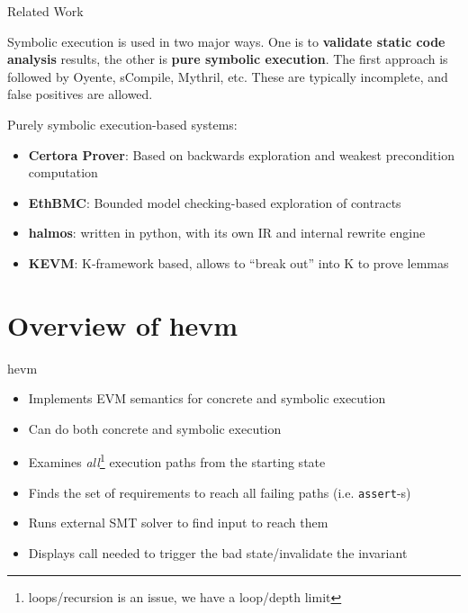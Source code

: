 \documentclass[aspectratio=169]{beamer}
\begin{document}
\begin{frame}{Related Work}

Symbolic execution is used in two major ways. One is to \textbf{validate static code analysis} results, the other is \textbf{pure symbolic execution}. The first approach is followed by Oyente, sCompile, Mythril, etc. These are typically incomplete, and false positives are allowed.

\bigskip

Purely symbolic execution-based systems:
\begin{itemize}
\item \textbf{Certora Prover}: Based on backwards exploration and weakest precondition computation
\item \textbf{EthBMC}: Bounded model checking-based exploration of contracts
\item \textbf{halmos}: written in python, with its own IR and internal rewrite engine
\item \textbf{KEVM}: K-framework based, allows to ``break out'' into K to prove lemmas
\end{itemize}
\end{frame}


\section{Overview of hevm}
\begin{frame}{hevm}
\begin{itemize}
\item Implements EVM semantics for concrete and symbolic execution
\item Can do both concrete and symbolic execution
\item Examines \emph{all}\footnote{loops/recursion is an issue, we have a loop/depth limit} execution paths from the starting state
\item Finds the set of requirements to reach all failing paths (i.e. \texttt{assert}-s)
\item Runs external SMT solver to find input to reach them
\item Displays call needed to trigger the bad state/invalidate the invariant
\end{itemize}
\end{frame}


%
%
%
\end{document}
